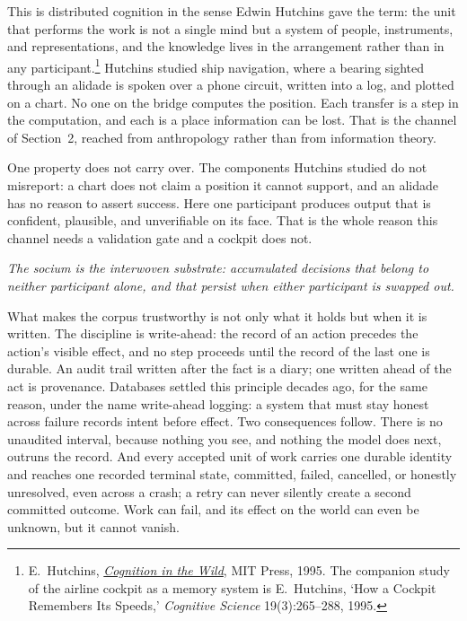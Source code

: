 \documentclass[11pt, a4paper]{article}
\newcommand{\pullquote}[1]{%
  \begin{pullquoteenv}%
    {\setstretch{1.35}\fontsize{11.5}{16}\itshape\color{indigo} #1}%
  \end{pullquoteenv}%
}
\begin{document}
This is distributed cognition in the sense Edwin Hutchins gave the term: the unit that
performs the work is not a single mind but a system of people, instruments, and
representations, and the knowledge lives in the arrangement rather than in any
participant.\footnote{E.~Hutchins, \href{https://mitpress.mit.edu/9780262581462/cognition-in-the-wild/}{\emph{Cognition
in the Wild}}, MIT Press, 1995. The companion study of the airline cockpit as a memory
system is E.~Hutchins, `How a Cockpit Remembers Its Speeds,' \emph{Cognitive Science}
19(3):265--288, 1995.} Hutchins studied ship navigation, where a bearing sighted through
an alidade is spoken over a phone circuit, written into a log, and plotted on a chart. No
one on the bridge computes the position. Each transfer is a step in the computation, and
each is a place information can be lost. That is the channel of Section~2, reached from
anthropology rather than from information theory.

One property does not carry over. The components Hutchins studied do not misreport: a
chart does not claim a position it cannot support, and an alidade has no reason to assert
success. Here one participant produces output that is confident, plausible, and
unverifiable on its face. That is the whole reason this channel needs a validation gate
and a cockpit does not.

\pullquote{The socium is the interwoven substrate: accumulated decisions that belong to
neither participant alone, and that persist when either participant is swapped out.}

What makes the corpus trustworthy is not only what it holds but when it is written. The
discipline is write-ahead: the record of an action precedes the action's visible effect,
and no step proceeds until the record of the last one is durable. An audit trail written
after the fact is a diary; one written ahead of the act is provenance. Databases settled
this principle decades ago, for the same reason, under the name write-ahead logging: a
system that must stay honest across failure records intent before effect. Two
consequences follow. There is no unaudited interval, because nothing you see, and
nothing the model does next, outruns the record. And every accepted unit of work carries
one durable identity and reaches one recorded terminal state, committed, failed,
cancelled, or honestly unresolved, even across a crash; a retry can never silently
create a second committed outcome. Work can fail, and its effect on the world can even
be unknown, but it cannot vanish.
\end{document}
